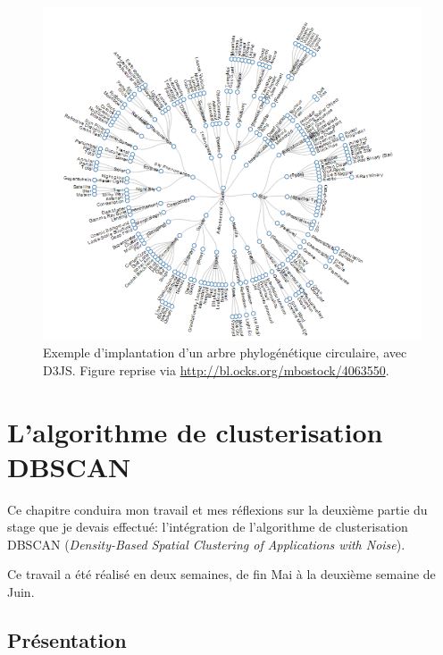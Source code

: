 \documentclass[pdftex,12pt,a4paper]{report}
\begin{document}
\begin{spacing}{1.2}
\begin{figure}[H]
\begin{center}
	\includegraphics[scale=0.6]{img/phylogenetic_tree_d3js.png}
\end{center}
\caption{Exemple d'implantation d'un arbre phylogénétique circulaire, avec D3JS. Figure reprise via \url{http://bl.ocks.org/mbostock/4063550}.}
\label{fig:phylogenetic_tree}
\end{figure}

\chapter{L'algorithme de clusterisation DBSCAN}

Ce chapitre conduira mon travail et mes réflexions sur la deuxième partie du stage que je devais effectué: l'intégration de l'algorithme de clusterisation DBSCAN (\textit{Density-Based Spatial Clustering of Applications with Noise}).

Ce travail a été réalisé en deux semaines, de fin Mai à la deuxième semaine de Juin.

\section{Présentation}


\end{spacing}
\end{document}
